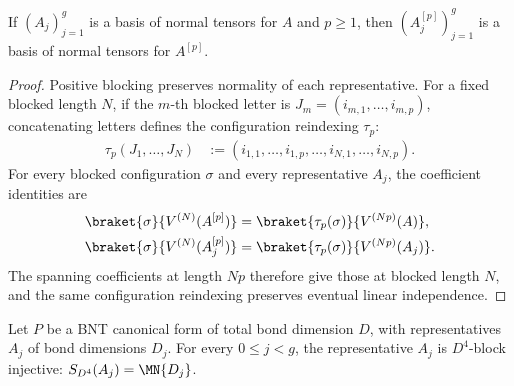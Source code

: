 \begin{lemma}
    \label{thm:cpsv_bnt_positive_blocking}
    \leanok
    If $(A_j)_{j=1}^{g}$ is a basis of normal tensors for $A$ and $p\geq1$,
    then $(A_j^{[p]})_{j=1}^{g}$ is a basis of normal tensors for $A^{[p]}$.
\end{lemma}

\begin{proof}
    \leanok
    Positive blocking preserves normality of each representative. For a fixed
    blocked length $N$, if the $m$-th blocked letter is
    $J_m=(i_{m,1},\ldots,i_{m,p})$, concatenating letters defines the
    configuration reindexing $\tau_p$:
    \begin{align}
        \tau_p(J_1,\ldots,J_N)
         & :=(i_{1,1},\ldots,i_{1,p},\ldots,
        i_{N,1},\ldots,i_{N,p}).
        \label{eq:cpsv_bnt_blocked_configuration_reindexing}
    \end{align}
    For every blocked configuration $\sigma$ and every representative $A_j$,
    the coefficient identities are
    \begin{align}
        \braket{\sigma}{V^{(N)}(A^{[p]})}
         & =\braket{\tau_p(\sigma)}{V^{(Np)}(A)},
        \label{eq:cpsv_bnt_blocked_tensor_coefficient} \\
        \braket{\sigma}{V^{(N)}(A_j^{[p]})}
         & =\braket{\tau_p(\sigma)}{V^{(Np)}(A_j)}.
        \label{eq:cpsv_bnt_blocked_representative_coefficient}
    \end{align}
    The spanning coefficients at length $Np$ therefore give those at blocked
    length $N$, and the same configuration reindexing preserves eventual
    linear independence.
\end{proof}

\begin{lemma}
    \label{thm:bnt_representatives_exact_total_dimension_pow_four}
    \leanok
    Let $P$ be a BNT canonical form of total bond dimension $D$, with
    representatives $A_j$ of bond dimensions $D_j$. For every
    $0\leq j<g$, the representative $A_j$ is $D^4$-block injective:
    $S_{D^4}(A_j)=\MN{D_j}$.
\end{lemma}

